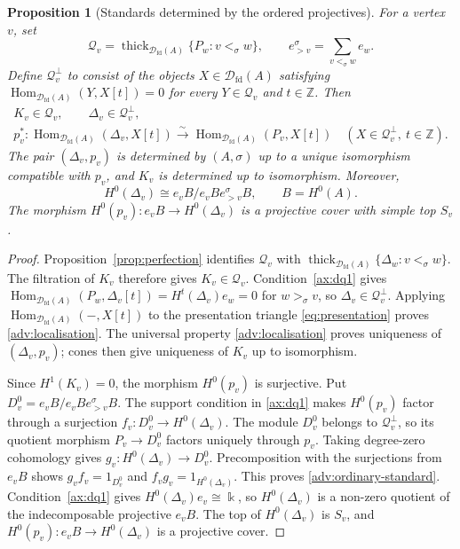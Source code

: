 \documentclass[11pt,a4paper]{article}
\newcommand{\D}{\mathcal D}
\newcommand{\ZZ}{\mathbb{Z}}
\newcommand{\std}{\Delta}
\DeclareMathOperator{\fd}{fd}
\DeclareMathOperator{\Hom}{Hom}
\DeclareMathOperator{\thick}{thick}
\theoremstyle{plain}
\newtheorem{proposition}[theorem]{Proposition}
\theoremstyle{definition}
\numberwithin{equation}{section}
\begin{document}
\begin{proposition}[Standards determined by the ordered projectives]
\label{adv:canonical}
For a vertex $v$, set
\begin{equation}\label{adv:tail}
 \mathcal Q_v=\thick_{\D_{\fd}(A)}\{P_w:v<_\sigma w\},
 \qquad e_{>v}^\sigma=\sum_{v<_\sigma w}e_w.
\end{equation}
Define $\mathcal Q_v^\perp$ to consist of the objects $X\in\D_{\fd}(A)$
satisfying $\Hom_{\D_{\fd}(A)}(Y,X[t])=0$ for every
$Y\in\mathcal Q_v$ and $t\in\ZZ$. Then
\begin{equation}\label{adv:localisation}
 \begin{gathered}
 K_v\in\mathcal Q_v,\qquad \std_v\in\mathcal Q_v^\perp,\\
 p_v^*:\Hom_{\D_{\fd}(A)}(\std_v,X[t])
 \xrightarrow{\sim}\Hom_{\D_{\fd}(A)}(P_v,X[t])
 \quad(X\in\mathcal Q_v^\perp,\ t\in\ZZ).
 \end{gathered}
\end{equation}
The pair $(\std_v,p_v)$ is determined by $(A,\sigma)$ up to a unique
isomorphism compatible with $p_v$, and $K_v$ is determined up to
isomorphism. Moreover,
\begin{equation}\label{adv:ordinary-standard}
 H^0(\std_v)\cong e_vB/e_vBe_{>v}^\sigma B,
 \qquad B=H^0(A).
\end{equation}
The morphism $H^0(p_v):e_vB\to H^0(\std_v)$ is a projective cover
with simple top $S_v$.
\end{proposition}
\begin{proof}
Proposition~\ref{prop:perfection} identifies $\mathcal Q_v$ with
$\thick_{\D_{\fd}(A)}\{\std_w:v<_\sigma w\}$.
The filtration of $K_v$ therefore gives $K_v\in\mathcal Q_v$.
Condition~\ref{ax:dq1} gives
$\Hom_{\D_{\fd}(A)}(P_w,\std_v[t])=H^t(\std_v)e_w=0$ for
$w>_\sigma v$, so $\std_v\in\mathcal Q_v^\perp$.
Applying $\Hom_{\D_{\fd}(A)}(-,X[t])$ to the presentation triangle
\eqref{eq:presentation} proves \eqref{adv:localisation}.
The universal property \eqref{adv:localisation} proves uniqueness of
$(\std_v,p_v)$; cones then give uniqueness of $K_v$ up to isomorphism.

Since $H^1(K_v)=0$, the morphism $H^0(p_v)$ is surjective.
Put $D_v^0=e_vB/e_vBe_{>v}^\sigma B$. The support condition in
\ref{ax:dq1} makes $H^0(p_v)$ factor through a surjection
$f_v:D_v^0\to H^0(\std_v)$.
The module $D_v^0$ belongs to $\mathcal Q_v^\perp$, so its quotient
morphism $P_v\to D_v^0$ factors uniquely through $p_v$.
Taking degree-zero cohomology gives
$g_v:H^0(\std_v)\to D_v^0$.
Precomposition with the surjections from $e_vB$ shows
$g_vf_v=1_{D_v^0}$ and $f_vg_v=1_{H^0(\std_v)}$.
This proves \eqref{adv:ordinary-standard}.
Condition~\ref{ax:dq1} gives $H^0(\std_v)e_v\cong\Bbbk$, so
$H^0(\std_v)$ is a non-zero quotient of the indecomposable projective
$e_vB$. The top of $H^0(\std_v)$ is $S_v$, and
$H^0(p_v):e_vB\to H^0(\std_v)$ is a projective cover.
\end{proof}
\end{document}
